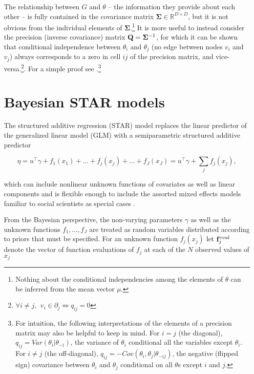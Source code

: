 The relationship between $G$ and $\theta$ -- the information they provide about each other -- is fully 
contained in the covariance matrix $\boldsymbol{\Sigma} \in \mathbb{R}^{D\times D}$, but it is not 
obvious from the individual elements of $\boldsymbol{\Sigma}$.\footnote{Nothing about the conditional 
independencies among the elements of $\theta$ can be inferred from the mean vector $\mu$.} It is 
more useful to instead consider the precision (inverse covariance) matrix 
$\mathbf{Q} =\boldsymbol{\Sigma}^{-1}$, for which it can be shown that conditional independence between 
$\theta_i$ and $\theta_j$ (no edge between nodes $v_i$ and $v_j$) always corresponds to a zero in 
cell $ij$ of the precision matrix, and vice-versa.\footnote{$\forall i \neq j, \:\: v_i \in \partial_j \iff q_{ij} = 0$}.  
For a simple proof see .\footnote{For intuition, the following interpretations of 
the elements of a precision matrix may also be helpful to keep in mind. For $i = j$ (the diagonal),  
$q_{ij} = Var(\theta_i | \theta_{-i})$, the variance of $\theta_i$ conditional all the variables except 
$\theta_i$. For $i \neq j$ (the off-diagonal), $q_{ij}  = -Cov(\theta_i, \theta_j | \theta_{-ij}) $, the negative 
(flipped sign) covariance between $\theta_i$ and $\theta_j$ conditional on all $\theta$s except $i$ and $j$.  }






\section{Bayesian STAR models}
\label{star}

The structured additive regression (STAR) model replaces the linear predictor of the generalized linear model (GLM) with a semiparametric structured additive predictor

\begin{equation*}
  \eta =  u^\intercal\gamma + f_1(x_1) + \ldots + f_j(x_j) + \ldots + f_J(x_J) =  u^\intercal\gamma + \sum_{j} f_j (x_j) ,
\end{equation*}

\noindent which can include nonlinear unknown functions of covariates as well as linear components and is flexible enough to include the assorted mixed effects models familiar to social scientists as special cases . 

From the Bayesian perspective, the non-varying parameters $\gamma$ as well as the unknown functions $f_1, \dots, f_J$ are treated as random variables distributed according to priors that must be specified. For an unknown function $f_j(x_j)$ let $\mathbf{f}_j^{eval}$ denote the vector of function evaluations of $f_j$ at each of the $N$ observed values of $x_j$ 


